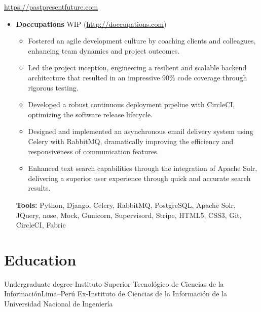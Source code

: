 \documentclass[11pt,a4paper,english]{moderncv}
\begin{document}
{
\url{https://pastpresentfuture.com}
\newline{}
\begin{itemize}
    \item \textbf{Doccupations}
        \newline{}
        WIP (\url{http://doccupations.com})
        \begin{itemize}
            \item Fostered an agile development culture by coaching clients and colleagues, enhancing team dynamics and project outcomes.
            \item Led the project inception, engineering a resilient and scalable backend architecture that resulted in an impressive 90\% code coverage through rigorous testing.
            \item Developed a robust continuous deployment pipeline with CircleCI, optimizing the software release lifecycle.
            \item Designed and implemented an asynchronous email delivery system using Celery with RabbitMQ, dramatically improving the efficiency and responsiveness of communication features.
            \item Enhanced text search capabilities through the integration of Apache Solr, delivering a superior user experience through quick and accurate search results.
        \end{itemize}
        \textbf{Tools:} Python, Django, Celery, RabbitMQ, PostgreSQL, Apache Solr, JQuery, nose, Mock, Gunicorn, Supervisord, Stripe, HTML5, CSS3, Git, CircleCI, Fabric
\end{itemize}
}

\subsection{}

\section{Education}
    {Undergraduate degree}
    {Instituto Superior Tecnológico de Ciencias de la Información}{Lima--Perú}
    {}{Ex-Instituto de Ciencias de la Información de la Universidad Nacional de Ingeniería}

\subsection{}
\end{document}
